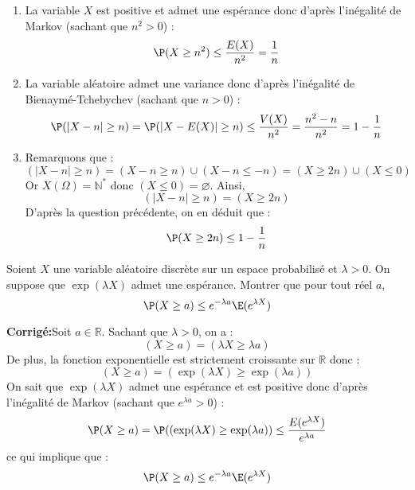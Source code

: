 \documentclass[a4paper,twoside,french,11pt]{VcCours}
\newcommand{\corr}{\textbf{Corrigé:}}
\begin{document}
\begin{enumerate}
\item La variable $X$ est positive et admet une espérance donc d'après l'inégalité de Markov (sachant que $n^2>0$) :
$$ \P(X \geq n^2) \leq \dfrac{E(X)}{n^2} = \dfrac{1}{n}$$
\item La variable aléatoire admet une variance donc d'après l'inégalité de Bienaymé-Tchebychev (sachant que $n>0$) :
$$ \P( \vert X- n \vert \geq n) =  \P( \vert X- E(X) \vert \geq n) \leq \dfrac{V(X)}{n^2} = \dfrac{n^2-n}{n^2} = 1 - \dfrac{1}{n}$$
\item Remarquons que :
$$ (\vert X- n \vert \geq n) = (X-n \geq n) \cup (X-n \leq -n) = (X \geq 2n) \cup (X \leq 0)$$
Or $X(\Omega)= \mathbb{N}^*$ donc $(X \leq 0) = \varnothing$. Ainsi,
$$ (\vert X- n \vert \geq n) = (X \geq 2n)$$
D'après la question précédente, on en déduit que :
$$\P(X \geq 2n) \leq 1 - \dfrac{1}{n} $$
\end{enumerate}

\begin{Exercice}{} Soient $X$ une variable aléatoire discrète sur un espace probabilisé et $\lambda >0$. On suppose que $\exp(\lambda X)$ admet une espérance. Montrer que pour tout réel $a$,
$$ \P(X \geq a) \leq e^{-\lambda a} \E(e^{\lambda X})$$
\end{Exercice}

\corr Soit $a \in \mathbb{R}$. Sachant que $\lambda>0$, on a :
$$ (X \geq a) = (\lambda X \geq \lambda a)$$
De plus, la fonction exponentielle est strictement croissante sur $\mathbb{R}$ donc :
$$ (X \geq a) = (\exp(\lambda X) \geq \exp(\lambda a))$$
On sait que $\exp(\lambda X)$ admet une espérance et est positive donc d'après l'inégalité de Markov (sachant que $e^{\lambda a}>0$) :
$$ \P(X \geq a) = \P((\exp(\lambda X) \geq \exp(\lambda a)) \leq \dfrac{E(e^{\lambda X})}{e^{\lambda a}}$$
ce qui implique que :
$$ \P(X \geq a) \leq e^{-\lambda a} \E(e^{\lambda X})$$
\end{document}
